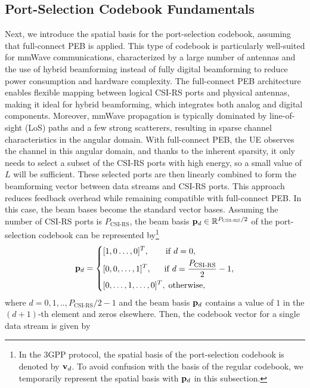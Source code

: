 \documentclass[lettersize,journal]{IEEEtran}
\begin{document}
\subsection{Port-Selection Codebook Fundamentals}
Next, we introduce the spatial basis for the port-selection codebook, assuming that full-connect PEB is applied. This type of codebook is particularly well-suited for mmWave communications, characterized by a large number of antennas and the use of hybrid beamforming instead of fully digital beamforming to reduce power consumption and hardware complexity. The full-connect PEB architecture enables flexible mapping between logical CSI-RS ports and physical antennas, making it ideal for hybrid beamforming, which integrates both analog and digital components. Moreover, mmWave propagation is typically dominated by line-of-sight (LoS) paths and a few strong scatterers, resulting in sparse channel characteristics in the angular domain. With full-connect PEB, the UE observes the channel in this angular domain, and thanks to the inherent sparsity, it only needs to select a subset of the CSI-RS ports with high energy, so a small value of $L$ will be sufficient. These selected ports are then linearly combined to form the beamforming vector between data streams and CSI-RS ports. This approach reduces feedback overhead while remaining compatible with full-connect PEB. In this case, the beam bases become the standard vector bases. Assuming the number of CSI-RS ports is ${P_{{\text{CSI-RS}}}}$, the beam basis ${{\bf{p}}_d} \in {{\mathbb{R}}^{{P_{{\text{CSI-RS}}}}/2}}$ of the port-selection codebook can be represented by\footnote{In the 3GPP protocol, the spatial basis of the port-selection codebook is denoted by ${{\bf{v}}_d}$. To avoid confusion with the basis of the regular codebook, we temporarily represent the spatial basis with ${{\bf{p}}_d}$ in this subsection.}
\begin{equation}
{{\bf{p}}_d} = \left\{ {\begin{split}
&{[1,0\ldots,0]^T,\qquad {\rm{if}}\;d = 0},\\
&{[0,0,\ldots,1]^T,\;\; \quad  {\rm{if}}\;d  = \frac{{P_{{\text{CSI-RS}}}} }{2}- 1},\\
&{[0,\ldots,1,\ldots,0]^T,\; {\rm{otherwise,}}}
\end{split}} \right.
\end{equation}
where $d=0,1,..,{P_{{\text{CSI-RS}}}}/2-1$ and the beam basis ${{\bf{p}}_d}$ contains a value of $1$ in the $(d+1)$-th element and zeros elsewhere. Then, the codebook vector for a single data stream is given by
\end{document}
